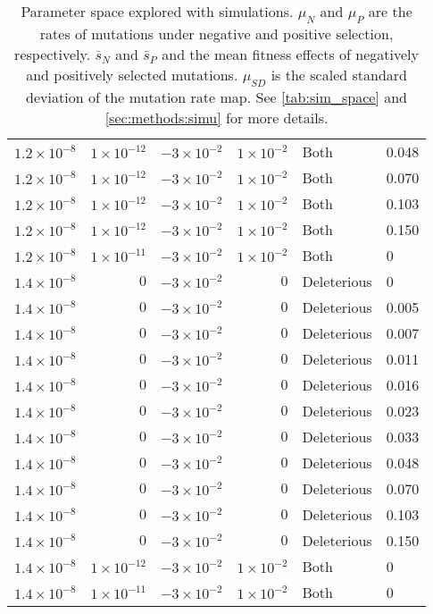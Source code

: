 \begin{table}
\begin{tabular}{rrrrll}
  $1.2 \times 10^{-8}$ & $1 \times 10^{-12}$ & $-3 \times 10^{-2}$ & $1 \times 10^{-2}$ & Both & 0.048 \\ 
  $1.2 \times 10^{-8}$ & $1 \times 10^{-12}$ & $-3 \times 10^{-2}$ & $1 \times 10^{-2}$ & Both & 0.070 \\ 
  $1.2 \times 10^{-8}$ & $1 \times 10^{-12}$ & $-3 \times 10^{-2}$ & $1 \times 10^{-2}$ & Both & 0.103 \\ 
  $1.2 \times 10^{-8}$ & $1 \times 10^{-12}$ & $-3 \times 10^{-2}$ & $1 \times 10^{-2}$ & Both & 0.150 \\ 
  $1.2 \times 10^{-8}$ & $1 \times 10^{-11}$ & $-3 \times 10^{-2}$ & $1 \times 10^{-2}$ & Both & 0 \\ 
  $1.4 \times 10^{-8}$ & $0$ & $-3 \times 10^{-2}$ & $0$ & Deleterious & 0 \\ 
  $1.4 \times 10^{-8}$ & $0$ & $-3 \times 10^{-2}$ & $0$ & Deleterious & 0.005 \\ 
  $1.4 \times 10^{-8}$ & $0$ & $-3 \times 10^{-2}$ & $0$ & Deleterious & 0.007 \\ 
  $1.4 \times 10^{-8}$ & $0$ & $-3 \times 10^{-2}$ & $0$ & Deleterious & 0.011 \\ 
  $1.4 \times 10^{-8}$ & $0$ & $-3 \times 10^{-2}$ & $0$ & Deleterious & 0.016 \\ 
  $1.4 \times 10^{-8}$ & $0$ & $-3 \times 10^{-2}$ & $0$ & Deleterious & 0.023 \\ 
  $1.4 \times 10^{-8}$ & $0$ & $-3 \times 10^{-2}$ & $0$ & Deleterious & 0.033 \\ 
  $1.4 \times 10^{-8}$ & $0$ & $-3 \times 10^{-2}$ & $0$ & Deleterious & 0.048 \\ 
  $1.4 \times 10^{-8}$ & $0$ & $-3 \times 10^{-2}$ & $0$ & Deleterious & 0.070 \\ 
  $1.4 \times 10^{-8}$ & $0$ & $-3 \times 10^{-2}$ & $0$ & Deleterious & 0.103 \\ 
  $1.4 \times 10^{-8}$ & $0$ & $-3 \times 10^{-2}$ & $0$ & Deleterious & 0.150 \\ 
  $1.4 \times 10^{-8}$ & $1 \times 10^{-12}$ & $-3 \times 10^{-2}$ & $1 \times 10^{-2}$ & Both & 0 \\ 
  $1.4 \times 10^{-8}$ & $1 \times 10^{-11}$ & $-3 \times 10^{-2}$ & $1 \times 10^{-2}$ & Both & 0 \\ 
   \hline
\end{tabular}
\label{tab:sim_params}
\caption{Parameter space explored with simulations. $\mu_N$ and $\mu_P$ are the rates of mutations under negative and positive selection, respectively.
$\bar{s}_N$ and $\bar{s}_P$ and the mean fitness effects of negatively and positively selected mutations. $\mu_{SD}$ is the scaled standard deviation of the mutation rate map. See \autoref{tab:sim_space} and \autoref{sec:methods:simu} for more details.} 
\end{table}


